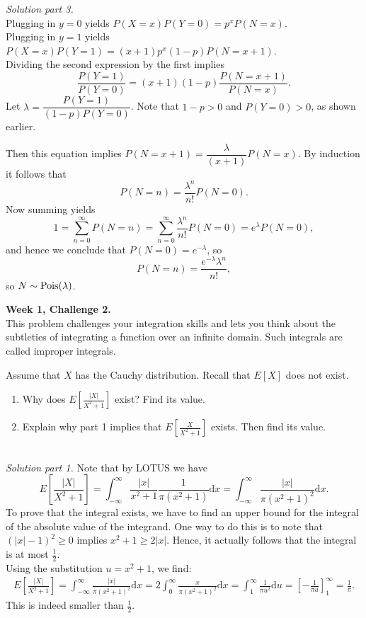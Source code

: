 \documentclass[12pt]{article}
\newcommand{\Pois}{\mathop{\mathgroup\symoperators Pois}\nolimits}
\begin{document}
 \newpage

 \textit{Solution part 3.} \\
 Plugging in $y=0$ yields $P(X=x)P(Y=0) = p^x P(N=x)$. \\
 Plugging in $y=1$ yields $P(X=x)P(Y=1) = (x+1)p^x (1-p) P(N=x+1)$. \\
 Dividing the second expression by the first implies $$\frac{P(Y=1)}{P(Y=0)} =  (x+1)(1-p) \frac{P(N=x+1)}{P(N=x)}.$$
 Let $\lambda = \dfrac{P(Y=1)}{(1-p)  P(Y=0)} $. Note that $1-p > 0$ and $P(Y=0) > 0$, as shown earlier.


 Then this equation implies $P(N=x+1) = \dfrac{\lambda}{(x+1)} P(N=x)$. By induction it follows that $$P(N = n) = \frac{\lambda^n}{n!} P(N=0).$$
 Now summing yields $$1 = \sum_{n=0}^\infty P(N=n) = \sum_{n=0}^\infty \frac{\lambda^n}{n!} P(N = 0) = e^{\lambda} P(N=0),$$
and hence we conclude that $P(N=0) = e^{-\lambda}$, so
$$P(N = n) = \frac{e^{-\lambda}\lambda^n}{n!},$$
so $N \sim \Pois(\lambda)$.

\newpage

\textbf{Week 1, Challenge 2.} \\
This problem challenges your integration skills and lets you think about the subtleties of integrating a function over an infinite domain. Such integrals are called improper integrals.

Assume that $X$ has the Cauchy distribution. Recall that $E[X]$ does not exist.
\begin{enumerate}
\item Why does $E \left[\frac{|X|}{X^2+1}\right]$ exist? Find its value.
\item Explain why part 1 implies that $E \left[\frac{X}{X^2+1}\right]$ exists. Then find its value. \\ \\
\end{enumerate}


\textit{Solution part 1.} Note that by LOTUS we have $$E \left[\frac{|X|}{X^2+1}\right] = \int_{-\infty}^\infty \frac{|x|}{x^2+1} \frac{1}{\pi(x^2+1)} \mathrm{d}x = \int_{-\infty}^\infty \frac{|x|}{\pi(x^2+1)^2} \mathrm{d}x.$$ To prove that the integral exists, we have to find an upper bound for the integral of the absolute value of the integrand. One way to do this is to note that $(|x|-1)^2 \geq 0$ implies $x^2+1 \geq 2|x|$. Hence, it actually follows that the integral is at most $\tfrac12$. \\
Using the substitution $u = x^2+1$, we find:
 \begin{align*} E \left[\frac{|X|}{X^2+1}\right] = \int_{-\infty}^\infty \frac{|x|}{\pi(x^2+1)^2} \mathrm{d}x = 2\int_{0}^\infty \frac{x}{\pi(x^2+1)^2} \mathrm{d}x = \int_{1}^\infty \frac{1}{\pi u^2} \mathrm{d}u = \left[ -\frac{1}{\pi u} \right]_1^\infty = \frac1\pi. \end{align*}
 This is indeed smaller than $\tfrac12$. \\
\end{document}

